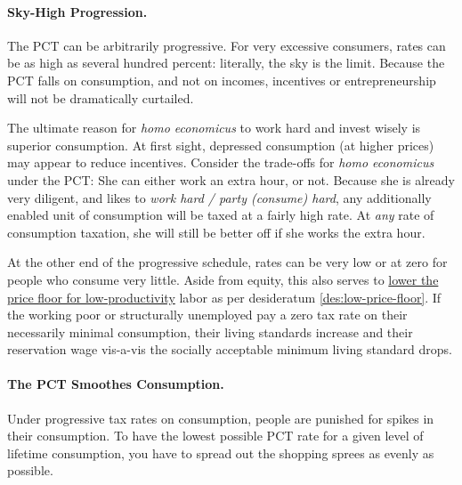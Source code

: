 \paragraph{Sky-High Progression.}
The PCT can be arbitrarily progressive.
For very excessive consumers, rates can be as high as several hundred percent:
literally, the sky is the limit.
Because the PCT falls on consumption, and not on incomes, incentives or entrepreneurship will not be dramatically curtailed.

The ultimate reason for \emph{homo economicus} to work hard and invest wisely is superior consumption.
At first sight, depressed consumption (at higher prices) may appear to reduce incentives.
Consider the trade-offs for \emph{homo economicus} under the PCT:
She can either work an extra hour, or not.
Because she is already very diligent, and likes to \emph{work hard / party (consume) hard}, any additionally enabled unit of consumption will be taxed at a fairly high rate.
At \emph{any} rate of consumption taxation, she will still be better off if she works the extra hour.

At the other end of the progressive schedule, rates can be very low or at zero for people who consume very little.
Aside from equity, this also serves to \hyperref[des:low-price-floor]{lower the price floor for low-productivity} labor as per desideratum \ref{des:low-price-floor}.
If the working poor or structurally unemployed pay a zero tax rate on their necessarily minimal consumption, their living standards increase and their reservation wage vis-a-vis the socially acceptable minimum living standard drops.

\paragraph{The PCT Smoothes Consumption.}
Under progressive tax rates on consumption, people are punished for spikes in their consumption.
To have the lowest possible PCT rate for a given level of lifetime consumption, you have to spread out the shopping sprees as evenly as possible.


